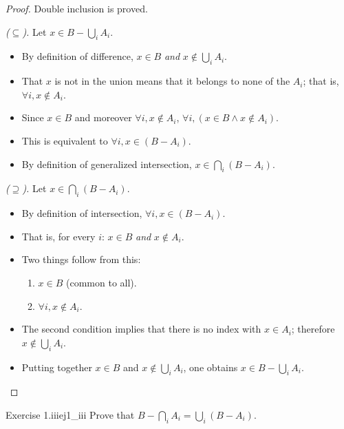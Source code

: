 \documentclass[11pt, a4paper]{article}
\begin{document}
\begin{proof}
Double inclusion is proved.

\textit{($\subseteq$).} Let $x \in B - \bigcup_{i} A_i$.
\begin{itemize}
    \item By definition of difference, $x \in B$ \emph{and} $x \notin \bigcup_{i} A_i$.
    \item That $x$ is not in the union means that it belongs to none of the $A_i$; that is,
    $\forall i, x \notin A_i$.
    \item Since $x \in B$ and moreover $\forall i, x \notin A_i$,
    $\forall i, (x \in B \land x \notin A_i)$.
    \item This is equivalent to $\forall i, x \in (B - A_i)$.
    \item By definition of generalized intersection, $x \in \bigcap_{i} (B - A_i)$.
\end{itemize}

\textit{($\supseteq$).} Let $x \in \bigcap_{i} (B - A_i)$.
\begin{itemize}
    \item By definition of intersection, $\forall i, x \in (B - A_i)$.
    \item That is, for every $i$: $x \in B$ \emph{and} $x \notin A_i$.
    \item Two things follow from this:
    \begin{enumerate}
        \item $x \in B$ (common to all).
        \item $\forall i, x \notin A_i$.
    \end{enumerate}
    \item The second condition implies that there is no index with $x \in A_i$; therefore
    $x \notin \bigcup_{i} A_i$.
    \item Putting together $x \in B$ and $x \notin \bigcup_{i} A_i$, one obtains $x \in B - \bigcup_{i} A_i$.
\end{itemize}
\end{proof}

\begin{proposicion}{Exercise 1.iii}{ej1_iii}
Prove that $B - \bigcap_{i} A_i = \bigcup_{i} (B - A_i)$.
\end{proposicion}
\end{document}
